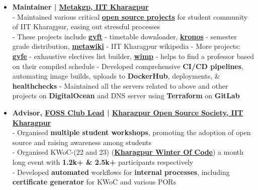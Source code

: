 \documentclass[a4paper,10pt]{extarticle} %
\begin{document}
\begin{itemize}[leftmargin=0.55cm, rightmargin=0.2cm, label={\Large\textbullet}]
\item \textbf{Maintainer | \href{https://metakgp.org/}{Metakgp, IIT Kharagpur}}\\
- Maintained various critical \href{https://github.com/metakgp}{\textbf{open source projects}} for student community of IIT Kharagpur, easing out stressful processes \\
- These projects include \href{https://github.com/metakgp/gyft}{\textbf{gyft}} - timetable downloader, \href{http://kronos.streamlit.app}{\textbf{kronos}} - semester grade distribution, \href{https://wiki.metakgp.org}{\textbf{metawiki}} - IIT Kharagpur wikipedia \newline
- More projects: \href{https://gyfe.metakgp.org}{\textbf{gyfe}} - exhaustive electives list builder, \href{https://github.com/metakgp/wimp}{\textbf{wimp}} - helps to find a professor based on their compiled schedule \newline
- Developed comprehensive \textbf{CI/CD pipelines}, automating image builds, uploads to \textbf{DockerHub}, deployments, \& \textbf{healthchecks} \newline
- Maintained all the servers related to above and other projects on \textbf{DigitalOcean} and DNS server using \textbf{Terraform} on \textbf{GitLab}

\item \textbf{Advisor, \href{https://fossunited.org/clubs}{\textbf{FOSS Club Lead}} | \href{https://kossiitkgp.org}{Kharagpur Open Source Society, IIT Kharagpur}}\\
- Organised \textbf{multiple student workshops}, promoting the adoption of open source and raising awareness among students \\
- Organised KWoC-(22 and 23) (\textbf{\href{https://kwoc.kossiitkgp.org/}{Kharagpur Winter Of Code}}) a month long event with \textbf{1.2k+ \& 2.5k+} participants respectively \\
- Developed \textbf{automated} workflows for \textbf{internal processes}, including \textbf{certificate generator} for KWoC and various PORs


\end{itemize}
\end{document}

